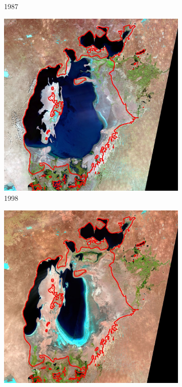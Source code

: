 \documentclass[12pt,a4paper]{article}
\begin{document}
\begin{figure}[H]
\begin{subfigure}[b]{0.19\textwidth}
        \caption{1987}
    \end{subfigure}
    \begin{subfigure}[b]{0.19\textwidth}
        \centering
        \includegraphics[width=\textwidth]{../img/1998o.jpg}
        \caption{1998}
    \end{subfigure}
    \begin{subfigure}[b]{0.19\textwidth}
        \centering
        \includegraphics[width=\textwidth]{../img/2006o.jpg}

\end{subfigure}
\end{figure}
\end{document}
